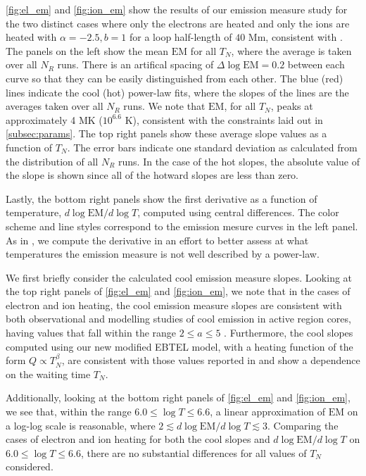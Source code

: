\documentclass[apj]{emulateapj}
\begin{document}
	\par \autoref{fig:el_em} and \autoref{fig:ion_em} show the results of our emission measure study for the two distinct cases where only the electrons are heated and only the ions are heated with $\alpha=-2.5,b=1$ for a loop half-length of $40$ Mm, consistent with . The panels on the left show the mean $\mathrm{EM}$ for all $T_N$, where the average is taken over all $N_{R}$ runs. There is an artifical spacing of $\Delta\log{\mathrm{EM}}=0.2$ between each curve so that they can be easily distinguished from each other. The blue (red) lines indicate the cool (hot) power-law fits, where the slopes of the lines are the averages taken over all $N_{R}$ runs. We note that $\mathrm{EM}$, for all $T_N$, peaks at approximately 4 MK ($10^{6.6}$ K), consistent with the constraints laid out in \autoref{subsec:params}. The top right panels show these average slope values as a function of $T_N$. The error bars indicate one standard deviation as calculated from the distribution of all $N_{R}$ runs. In the case of the hot slopes, the absolute value of the slope is shown since all of the hotward slopes are less than zero. 
	\par Lastly, the bottom right panels show the first derivative as a function of temperature, $d\log{\mathrm{EM}}/d\log{T}$, computed using central differences. The color scheme and line styles correspond to the emission mesure curves in the left panel. As in , we compute the derivative in an effort to better assess at what temperatures the emission measure is not well described by a power-law.
	\par We first briefly consider the calculated cool emission measure slopes. Looking at the top right panels of \autoref{fig:el_em} and \autoref{fig:ion_em}, we note that in the cases of electron and ion heating, the cool emission measure slopes are consistent with both observational and modelling studies of cool emission in active region cores, having values that fall within the range $2\le a\le5$ \citep[and references therein]{bradshaw_diagnosing_2012}. Furthermore, the cool slopes computed using our new modified EBTEL model, with a heating function of the form $Q\propto T_N^{\beta}$, are consistent with those values reported in \citet{cargill_active_2014} and show a dependence on the waiting time $T_N$.  
	\par Additionally, looking at the bottom right panels of \autoref{fig:el_em} and \autoref{fig:ion_em}, we see that, within the range $6.0\le\log{T}\le6.6$, a linear approximation of $\mathrm{EM}$ on a log-log scale is reasonable, where $2\lesssim d\log{\mathrm{EM}/d\log{T}}\lesssim3$. Comparing the cases of electron and ion heating for both the cool slopes and $d\log{\mathrm{EM}/d\log{T}}$ on $6.0\le\log{T}\le6.6$, there are no substantial differences for all values of $T_N$ considered.
\end{document}
